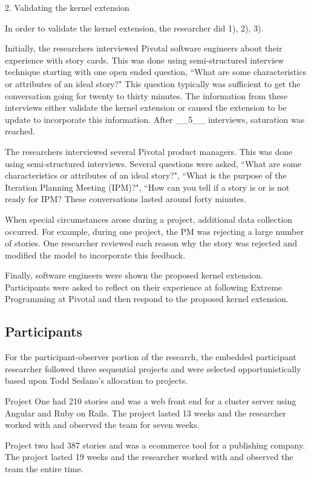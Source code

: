 \documentclass[preprint,12pt,3p]{elsarticle}
\begin{document}
2. Validating the kernel extension

In order to validate the kernel extension, the researcher did 1), 2), 3).

Initially, the researchers interviewed Pivotal software engineers about their experience with story cards. This was done using semi-structured interview technique starting with one open ended question, ``What are some characteristics or attributes of an ideal story?" This question typically was sufficient to get the conversation going for twenty to thirty minutes. The information from these interviews either validate the kernel extension or caused the extension to be update to incorporate this information. After __5__ interviews, saturation was reached.

The researchers interviewed several Pivotal product managers. This was done using semi-structured interviews. Several questions were asked, ``What are some characteristics or attributes of an ideal story?", ``What is the purpose of the Iteration Planning Meeting (IPM)?", ``How can you tell if a story is or is not ready for IPM? These conversations lasted around forty minutes. 

When special circumstances arose during a project, additional data collection occurred. For example, during one project, the PM was rejecting a large number of stories. One researcher reviewed each reason why the story was rejected and modified the model to incorporate this feedback.

Finally, software engineers were shown the proposed kernel extension. Participants were asked to reflect on their experience at following Extreme Programming at Pivotal and then respond to the proposed kernel extension.

\subsection{Participants}
For the participant-observer portion of the research, the embedded participant researcher followed three sequential projects and were selected opportunistically based upon Todd Sedano's allocation to projects. 

Project One had 210 stories and was a web front end for a cluster server using Angular and Ruby on Rails. The project lasted 13 weeks and the researcher worked with and observed the team for seven weeks. 

Project two had 387 stories and was a ecommerce tool for a publishing company. The project lasted 19 weeks and the researcher worked with and observed the team the entire time.
\end{document}
